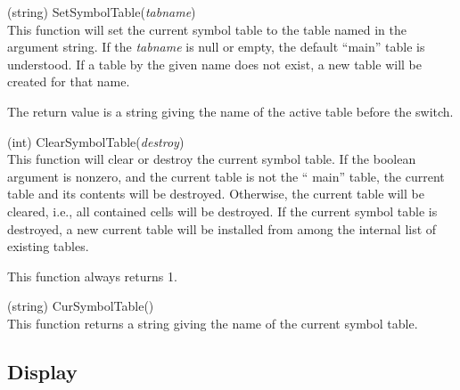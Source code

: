 \begin{description}
\item{(string) \vt SetSymbolTable({\it tabname\/})}\\
This function will set the current symbol table to the table named in
the argument string.  If the {\it tabname} is null or empty, the
default ``{\vt main}'' table is understood.  If a table by the given
name does not exist, a new table will be created for that name.
   
The return value is a string giving the name of the active table
before the switch.

\item{(int) \vt ClearSymbolTable({\it destroy\/})}\\
This function will clear or destroy the current symbol table.  If the
boolean argument is nonzero, and the current table is not the ``{\vt
main}'' table, the current table and its contents will be destroyed. 
Otherwise, the current table will be cleared, i.e., all contained
cells will be destroyed.  If the current symbol table is destroyed, a
new current table will be installed from among the internal list of
existing tables.
   
This function always returns 1.

\item{(string) \vt CurSymbolTable()}\\
This function returns a string giving the name of the current
symbol table.

\end{description}

\subsection{Display}

